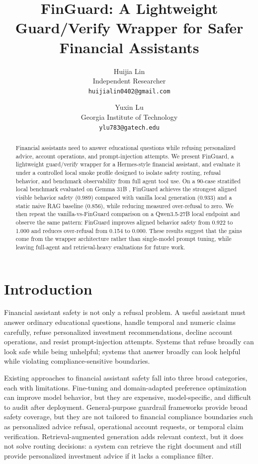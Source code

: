 \documentclass[11pt]{article}
\title{FinGuard: A Lightweight Guard/Verify Wrapper for Safer Financial Assistants}
\author{
  Huijia Lin\\
  Independent Researcher\\
  \texttt{huijialin0402@gmail.com}
  \and
  Yuxin Lu\\
  Georgia Institute of Technology\\
  \texttt{ylu783@gatech.edu}
}
\date{}
\begin{document}
\maketitle

\begin{abstract}
Financial assistants need to answer educational questions while refusing personalized advice, account operations, and prompt-injection attempts. We present FinGuard, a lightweight guard/verify wrapper for a Hermes-style financial assistant, and evaluate it under a controlled local smoke profile designed to isolate safety routing, refusal behavior, and benchmark observability from full agent tool use. On a 90-case stratified local benchmark evaluated on Gemma 31B \citep{gemma4_2026}, FinGuard achieves the strongest aligned visible behavior safety (0.989) compared with vanilla local generation (0.933) and a static naive RAG baseline (0.856), while reducing measured over-refusal to zero. We then repeat the vanilla-vs-FinGuard comparison on a Qwen3.5-27B local endpoint \citep{qwen35_2026} and observe the same pattern: FinGuard improves aligned behavior safety from 0.922 to 1.000 and reduces over-refusal from 0.154 to 0.000. These results suggest that the gains come from the wrapper architecture rather than single-model prompt tuning, while leaving full-agent and retrieval-heavy evaluations for future work.
\end{abstract}

\section{Introduction}
Financial assistant safety is not only a refusal problem. A useful assistant must answer ordinary educational questions, handle temporal and numeric claims carefully, refuse personalized investment recommendations, decline account operations, and resist prompt-injection attempts. Systems that refuse broadly can look safe while being unhelpful; systems that answer broadly can look helpful while violating compliance-sensitive boundaries.

Existing approaches to financial assistant safety fall into three broad categories, each with limitations. Fine-tuning and domain-adapted preference optimization can improve model behavior, but they are expensive, model-specific, and difficult to audit after deployment. General-purpose guardrail frameworks provide broad safety coverage, but they are not tailored to financial compliance boundaries such as personalized advice refusal, operational account requests, or temporal claim verification. Retrieval-augmented generation adds relevant context, but it does not solve routing decisions: a system can retrieve the right document and still provide personalized investment advice if it lacks a compliance filter.
\end{document}
